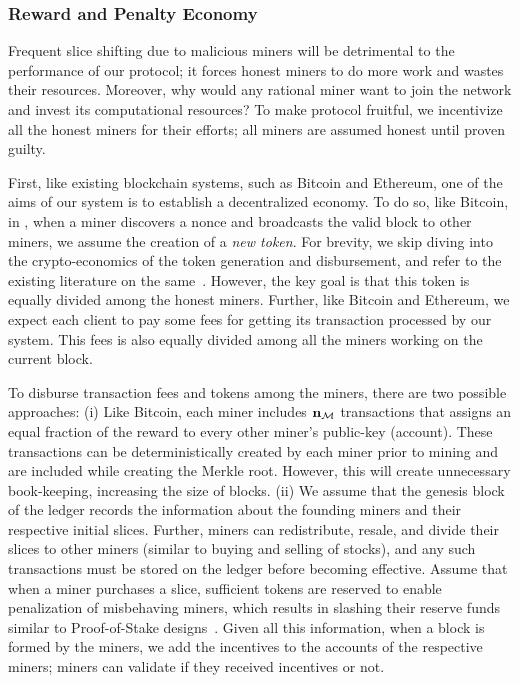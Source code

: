 \subsubsection{Reward and Penalty Economy}
Frequent slice shifting due to malicious miners will be detrimental to the 
performance of our \PoC{} protocol; it forces honest miners to do more work and 
wastes their resources. Moreover, why would any rational miner want to join the 
\PoC{} network and invest its computational resources? To make \PoC{} protocol 
fruitful, we incentivize all the honest miners for their efforts; all miners 
are assumed honest until proven guilty. 

First, like existing blockchain systems, such as Bitcoin and Ethereum, one of 
the aims of our \DualChain{} system is to establish a decentralized economy. 
To do so, like Bitcoin, in \PoC{}, when a miner discovers a nonce and broadcasts 
the valid block to other miners, we assume the creation of a {\em new token}. For 
brevity, we skip diving into the crypto-economics of the token generation and 
disbursement, and refer to the existing literature on the same~\cite{bitcoin,ether}. 
However, the key goal is that this token is equally divided among the honest 
miners. Further, like Bitcoin and Ethereum, we expect each client to pay some 
fees for getting its transaction processed by our \DualChain{} system. This 
fees is also equally divided among all the miners working on the current block.

To disburse transaction fees and tokens among the miners, there are two possible 
approaches: 
(i) Like Bitcoin, each miner includes $\mathbf{n}_{\mathcal{M}{}}$ transactions that assigns an 
equal fraction of the reward to every other miner's public-key (account). These 
transactions can be deterministically created by each miner prior to mining and are 
included while creating the Merkle root. However, this will create unnecessary 
book-keeping, increasing the size of blocks.
(ii) We assume that the genesis block of the ledger records 
the information about the founding miners and their respective initial slices.
Further, miners can redistribute, resale, and divide their slices to other miners 
(similar to buying and selling of stocks), and any such transactions must be stored 
on the ledger before becoming effective. Assume that when a miner purchases a slice, 
sufficient tokens are reserved to enable penalization of misbehaving miners, 
which results in slashing their reserve funds similar to Proof-of-Stake 
designs~\cite{blockchain-book}. Given all this information, when a block is 
formed by the \PoC{} miners, we add the incentives to the accounts of
the respective miners; miners can validate if they received incentives or not. 

